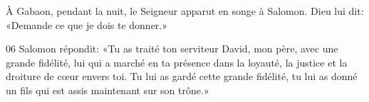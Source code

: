  À Gabaon, pendant la nuit, le Seigneur apparut en songe à Salomon. Dieu lui dit: «Demande ce que je dois te donner.»

06 Salomon répondit: «Tu as traité ton serviteur David, mon père, avec une grande fidélité, lui qui a marché en ta présence dans la loyauté, la justice et la droiture de cœur envers toi. Tu lui as gardé cette grande fidélité, tu lui as donné un fils qui est assis maintenant sur son trône.»
